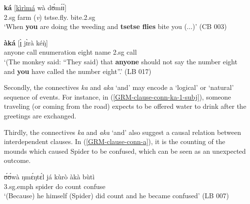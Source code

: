 \ea\label{GRM-clause-conn-(a)ka-2-subj} 

\ea\label{GRM-clause-conn-ka-2-subj} 
\gll  [dɪ̀      \underline{ɪ̀}       wáà          párà]  \textbf{ká} 
[\underline{kìrìmá}     wà    dʊ́mɪ́ɪ́]\\
{\conn}    {\sc 2.sg}    {\ingr}     {farm ({\it v})}     {\conn} 
tstse.fly.{\pl}        {\ingr}  bite.{\sc 2.sg} \\
\glt  `When  \textbf{you} are doing the weeding and  \textbf{tsetse flies} bite
you (...)' (CB 003) 

\ex\label{GRM-clause-conn-aka-2-subj} 
 \textbf{àká}  [\underline{ɪ̀}    jɪ̀rà   kéŋ̀]  \\
{\comp}   anyone              {\neg}   {\itr} {\ingr}  
   call         enumeration          
eight    name      {\conn}   {\sc 2.sg}   call     {\adv} \\
\glt  `(The monkey said:  ``They said) that \textbf{anyone} should not say the
number eight and \textbf{you} have called the number eight''.' (LB
017) 

\z 
 \z


Secondly, the connectives  {\it ka} and {\it aka} `and'  may encode a 
`logical' or `natural'
sequence of events.   For instance, in (\ref{GRM-clause-conn-ka-1-subj}), 
someone traveling (or coming from the road) expects to be offered
water to drink
after the greetings are exchanged. 



Thirdly, the  connectives  {\it ka} and {\it aka} `and' 
 also suggest a causal relation between interdependent clauses. In 
(\ref{GRM-clause-conn-a}), it is the counting of the mounds which caused Spider
to be confused, which can be seen as an unexpected outcome.  



\ea\label{GRM-clause-conn-a} 
\gll   ʊ́ʊ́wà  ŋmɛ́ŋtɛ́l   já          kùrò 
àkà    bùtì \\
{\sc 3.sg.emph}   spider do count     
{\conn}  confuse\\
\glt  `(Because) he himself (Spider) did count and he became confused'
(LB  007) 
 \z


